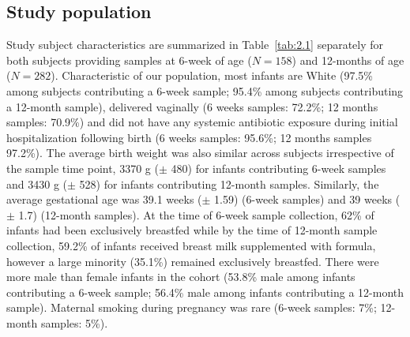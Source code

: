 \subsection{Study population}
Study subject characteristics are summarized in Table~\ref{tab:2.1} separately for both subjects providing samples at 6-week of age ($N = 158$) and 12-months of age ($N = 282$). Characteristic of our population, most infants are White (97.5\% among subjects contributing a 6-week sample; 95.4\% among subjects contributing a 12-month sample), delivered vaginally (6 weeks samples: 72.2\%; 12 months samples: 70.9\%) and did not have any systemic antibiotic exposure during initial hospitalization following birth (6 weeks samples: 95.6\%; 12 months samples 97.2\%). The average birth weight was also similar across subjects irrespective of the sample time point, 3370 g ($\pm$ 480) for infants contributing 6-week samples and 3430 g ($\pm$ 528) for infants contributing 12-month samples. Similarly, the average gestational age was 39.1 weeks ($\pm$ 1.59) (6-week samples) and 39 weeks ($\pm$ 1.7) (12-month samples). At the time of 6-week sample collection, 62\% of infants had been exclusively breastfed while by the time of 12-month sample collection, 59.2\% of infants received breast milk supplemented with formula, however a large minority (35.1\%) remained exclusively breastfed. There were more male than female infants in the cohort (53.8\% male among infants contributing a 6-week sample; 56.4\% male among infants contributing a 12-month sample). Maternal smoking during pregnancy was rare (6-week samples: 7\%; 12-month samples: 5\%). 
 
